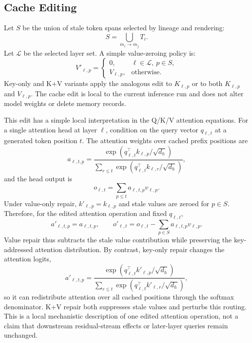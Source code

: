 \documentclass[11pt]{article}
\begin{document}
\subsection{Cache Editing}

Let $S$ be the union of stale token spans selected by lineage and rendering:
\[
  S = \bigcup_{m_i \rightarrow m_j} T_i.
\]
Let $\mathcal{L}$ be the selected layer set. A simple value-zeroing policy is:
\[
  V'_{\ell,p} =
  \begin{cases}
    0, & \ell \in \mathcal{L},\ p \in S,\\
    V_{\ell,p}, & \text{otherwise}.
  \end{cases}
\]
Key-only and K+V variants apply the analogous edit to $K_{\ell,p}$ or to both
$K_{\ell,p}$ and $V_{\ell,p}$. The cache edit is local to the current
inference run and does not alter model weights or delete memory records.

This edit has a simple local interpretation in the Q/K/V attention equations.
For a single attention head at layer $\ell$, condition on the query vector
$q_{\ell,t}$ at a generated token position $t$. The attention weights over
cached prefix positions are
\[
  a_{\ell,t,p}
  =
  \frac{\exp(q_{\ell,t}^{\top} k_{\ell,p} / \sqrt{d_h})}
       {\sum_{r \leq t} \exp(q_{\ell,t}^{\top} k_{\ell,r} / \sqrt{d_h})},
\]
and the head output is
\[
  o_{\ell,t} = \sum_{p \leq t} a_{\ell,t,p} v_{\ell,p}.
\]
Under value-only repair, $k'_{\ell,p}=k_{\ell,p}$ and stale values are zeroed
for $p \in S$. Therefore, for the edited attention operation and fixed
$q_{\ell,t}$,
\[
  a'_{\ell,t,p}=a_{\ell,t,p},
  \qquad
  o'_{\ell,t}
  =
  o_{\ell,t}
  -
  \sum_{p \in S} a_{\ell,t,p} v_{\ell,p}.
\]
Value repair thus subtracts the stale value contribution while preserving the
key-addressed attention distribution. By contrast, key-only repair changes the
attention logits,
\[
  a'_{\ell,t,p}
  =
  \frac{\exp(q_{\ell,t}^{\top} k'_{\ell,p} / \sqrt{d_h})}
       {\sum_{r \leq t} \exp(q_{\ell,t}^{\top} k'_{\ell,r} / \sqrt{d_h})},
\]
so it can redistribute attention over all cached positions through the softmax
denominator. K+V repair both suppresses stale values and perturbs this routing.
This is a local mechanistic description of one edited attention operation, not
a claim that downstream residual-stream effects or later-layer queries remain
unchanged.
\end{document}
